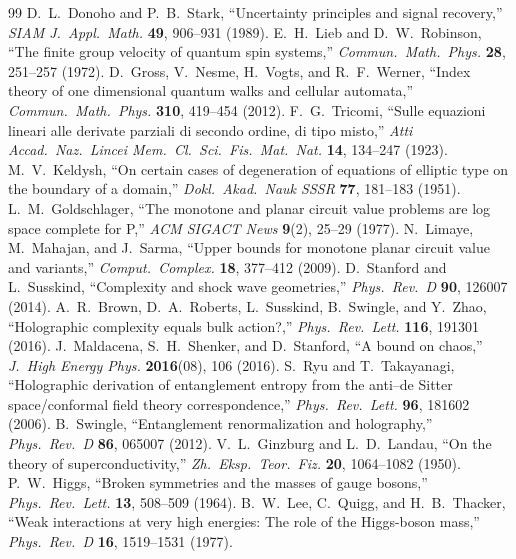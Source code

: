 \documentclass[11pt,a4paper]{article}
\theoremstyle{definition}
\begin{document}
\begin{thebibliography}{99}
 D.\ L.\ Donoho and P.\ B.\ Stark, ``Uncertainty principles and signal recovery,'' \emph{SIAM J.\ Appl.\ Math.} \textbf{49}, 906--931 (1989).
 E.\ H.\ Lieb and D.\ W.\ Robinson, ``The finite group velocity of quantum spin systems,'' \emph{Commun.\ Math.\ Phys.} \textbf{28}, 251--257 (1972).
 D.\ Gross, V.\ Nesme, H.\ Vogts, and R.\ F.\ Werner, ``Index theory of one dimensional quantum walks and cellular automata,'' \emph{Commun.\ Math.\ Phys.} \textbf{310}, 419--454 (2012).
 F.\ G.\ Tricomi, ``Sulle equazioni lineari alle derivate parziali di secondo ordine, di tipo misto,'' \emph{Atti Accad.\ Naz.\ Lincei Mem.\ Cl.\ Sci.\ Fis.\ Mat.\ Nat.} \textbf{14}, 134--247 (1923).
 M.\ V.\ Keldysh, ``On certain cases of degeneration of equations of elliptic type on the boundary of a domain,'' \emph{Dokl.\ Akad.\ Nauk SSSR} \textbf{77}, 181--183 (1951).
 L.\ M.\ Goldschlager, ``The monotone and planar circuit value problems are log space complete for P,'' \emph{ACM SIGACT News} \textbf{9}(2), 25--29 (1977).
 N.\ Limaye, M.\ Mahajan, and J.\ Sarma, ``Upper bounds for monotone planar circuit value and variants,'' \emph{Comput.\ Complex.} \textbf{18}, 377--412 (2009).
 D.\ Stanford and L.\ Susskind, ``Complexity and shock wave geometries,'' \emph{Phys.\ Rev.\ D} \textbf{90}, 126007 (2014).
 A.\ R.\ Brown, D.\ A.\ Roberts, L.\ Susskind, B.\ Swingle, and Y.\ Zhao, ``Holographic complexity equals bulk action?,'' \emph{Phys.\ Rev.\ Lett.} \textbf{116}, 191301 (2016).
 J.\ Maldacena, S.\ H.\ Shenker, and D.\ Stanford, ``A bound on chaos,'' \emph{J.\ High Energy Phys.} \textbf{2016}(08), 106 (2016).
 S.\ Ryu and T.\ Takayanagi, ``Holographic derivation of entanglement entropy from the anti--de Sitter space/conformal field theory correspondence,'' \emph{Phys.\ Rev.\ Lett.} \textbf{96}, 181602 (2006).
 B.\ Swingle, ``Entanglement renormalization and holography,'' \emph{Phys.\ Rev.\ D} \textbf{86}, 065007 (2012).
 V.\ L.\ Ginzburg and L.\ D.\ Landau, ``On the theory of superconductivity,'' \emph{Zh.\ Eksp.\ Teor.\ Fiz.} \textbf{20}, 1064--1082 (1950).
 P.\ W.\ Higgs, ``Broken symmetries and the masses of gauge bosons,'' \emph{Phys.\ Rev.\ Lett.} \textbf{13}, 508--509 (1964).
 B.\ W.\ Lee, C.\ Quigg, and H.\ B.\ Thacker, ``Weak interactions at very high energies: The role of the Higgs-boson mass,'' \emph{Phys.\ Rev.\ D} \textbf{16}, 1519--1531 (1977).

\end{thebibliography}
\end{document}
